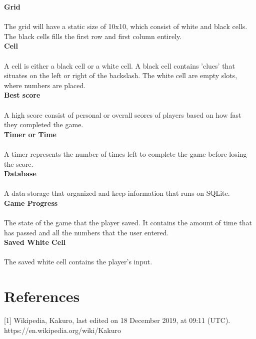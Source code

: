 \documentclass[12pt]{article}
\begin{document}
\textbf{Grid} \\\\
The grid will have a static size of 10x10, which consist of white and black cells. The black cells fills the first row and first column entirely.  \\

\textbf{Cell} \\\\
A cell is either a black cell or a white cell. A black cell contains 'clues' that situates on the left or right of the backslash. The white cell are empty slots, where numbers are placed. \\

\textbf{Best score} \\\\
A high score consist of personal or overall scores of players based on how fast they completed the game.\\

\textbf{Timer or Time} \\\\
A timer represents the number of times left to complete the game before losing the score.\\

\textbf{Database} \\\\
A data storage that organized and keep information that runs on SQLite. \\

\textbf{Game Progress} \\\\
The state of the game that the player saved. It contains the amount of time that has passed and all the numbers that the user entered. \\

\textbf{Saved White Cell}\\\\
The saved white cell contains the player's input. \\

\newpage

\section{References}

[1] Wikipedia, Kakuro, last edited on 18 December 2019, at 09:11 (UTC).\\
https://en.wikipedia.org/wiki/Kakuro\\
  
\end{document}
